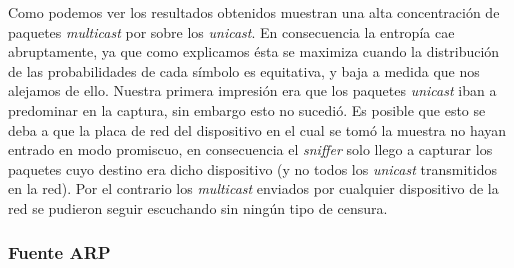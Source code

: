 Como podemos ver los resultados obtenidos muestran una alta concentración de
paquetes \textit{multicast} por sobre los \textit{unicast}. En consecuencia la
entropía cae abruptamente, ya que como explicamos ésta se maximiza cuando la
distribución de las probabilidades de cada símbolo es equitativa, y baja a
medida que nos alejamos de ello. Nuestra primera impresión era que los
paquetes \textit{unicast} iban a predominar en la captura, sin embargo esto no
sucedió. Es posible que esto se deba a que la placa de red del dispositivo en
el cual se tomó la muestra no hayan entrado en modo promiscuo, en consecuencia
el \textit{sniffer} solo llego a capturar los paquetes cuyo destino era dicho
dispositivo (y no todos los \textit{unicast} transmitidos en la red). Por el
contrario los \textit{multicast} enviados por cualquier dispositivo de la red
se pudieron seguir escuchando sin ningún tipo de censura.

\clearpage
\subsubsection{Fuente ARP}

\begin{figure}[hp!]
	\begin{minipage}[b]{0.9\linewidth}
	\end{minipage}
\end{figure}

